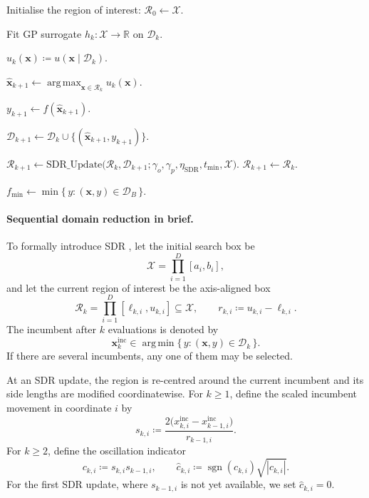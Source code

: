 \documentclass[pdflatex,sn-mathphys-num]{sn-jnl}%
\theoremstyle{thmstyleone}%
\theoremstyle{thmstyletwo}%
\theoremstyle{thmstylethree}%
\begin{document}
\begin{appendices}
\begin{algorithm}[h]
\begin{algorithmic}[1]
\State Initialise the region of interest: $\mathcal R_0 \leftarrow \mathcal X$.

    \State Fit GP surrogate $h_k:\mathcal X\to\mathbb R$ on $\mathcal D_k$.

    \State $u_k(\mathbf x)\coloneq u(\mathbf x\mid\mathcal D_k)$. 

    \State $\hat{\mathbf x}_{k+1} \leftarrow \operatorname*{arg\,max}_{\mathbf x\in\mathcal R_k} u_k(\mathbf x)$. 

    \State $y_{k+1}\leftarrow f(\hat{\mathbf x}_{k+1})$.

    \State $\mathcal D_{k+1} \leftarrow \mathcal D_k\cup\{(\hat{\mathbf x}_{k+1},y_{k+1})\}$. 

     
        \State $\mathcal R_{k+1} \leftarrow \mathrm{SDR\_Update}\bigl(\mathcal R_k,\mathcal D_{k+1};\gamma_o,\gamma_p,\eta_{\mathrm{SDR}},t_{\min},\mathcal X\bigr)$.
    \Else
        \State $\mathcal R_{k+1}\leftarrow\mathcal R_k$.
    \EndIf
\EndFor

\State \Return $f_{\min} \leftarrow \min\{\,y:(\mathbf x,y)\in\mathcal D_B\,\}$.
\end{algorithmic}
\end{algorithm}


\paragraph{Sequential domain reduction in brief.}
To formally introduce SDR \cite{SDR}, let the initial search box be
\[
    \mathcal X
    =
    \prod_{i=1}^D [a_i,b_i],
\]
and let the current region of interest be the axis-aligned box
\[
    \mathcal R_k
    =
    \prod_{i=1}^D [\ell_{k,i},u_{k,i}]
    \subseteq \mathcal X,
    \qquad
    r_{k,i}\coloneq u_{k,i}-\ell_{k,i}.
\]
The incumbent after \(k\) evaluations is denoted by
\[
    \mathbf x_k^{\mathrm{inc}}
    \in
    \operatorname*{arg\,min}
    \{\,y:(\mathbf x,y)\in\mathcal D_k\,\}.
\]
If there are several incumbents, any one of them may be selected.

At an SDR update, the region is re-centred around the current incumbent and its side lengths are modified coordinatewise. For \(k\geq 1\), define the scaled incumbent movement in coordinate \(i\) by
\[
    s_{k,i}
    \coloneq
    \frac{2\bigl(x_{k,i}^{\mathrm{inc}}-x_{k-1,i}^{\mathrm{inc}}\bigr)}
         {r_{k-1,i}} .
\]
For \(k\geq 2\), define the oscillation indicator
\[
    c_{k,i}\coloneq s_{k,i}s_{k-1,i},
    \qquad
    \widehat c_{k,i}
    \coloneq
    \operatorname{sgn}(c_{k,i})\sqrt{|c_{k,i}|}.
\]
For the first SDR update, where \(s_{k-1,i}\) is not yet available, we set
\(\widehat c_{k,i}=0\).


\end{appendices}
\end{document}
